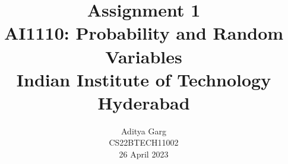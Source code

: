 \documentclass[journal,12pt,twocolumn]{IEEEtran}
\begin{document}
\newtheorem{theorem}{Theorem}[section]
\newtheorem{problem}{Problem}
\newtheorem{proposition}{Proposition}[section]
\newtheorem{lemma}{Lemma}[section]
\newtheorem{corollary}[theorem]{Corollary}
\newtheorem{example}{Example}[section]
\newtheorem{definition}[problem]{Definition}
\newcommand{\BEQA}{\begin{eqnarray}}
\newcommand{\EEQA}{\end{eqnarray}}
\newcommand{\define}{\stackrel{\triangle}{=}}



\providecommand{\mbf}{\mathbf}
\providecommand{\pr}[1]{\ensuremath{\Pr\left(#1\right)}}
\providecommand{\qfunc}[1]{\ensuremath{Q\left(#1\right)}}
\providecommand{\sbrak}[1]{\ensuremath{{}\left[#1\right]}}
\providecommand{\lsbrak}[1]{\ensuremath{{}\left[#1\right.}}
\providecommand{\rsbrak}[1]{\ensuremath{{}\left.#1\right]}}
\providecommand{\brak}[1]{\ensuremath{\left(#1\right)}}
\providecommand{\lbrak}[1]{\ensuremath{\left(#1\right.}}
\providecommand{\rbrak}[1]{\ensuremath{\left.#1\right)}}
\providecommand{\cbrak}[1]{\ensuremath{\left\{#1\right\}}}
\providecommand{\lcbrak}[1]{\ensuremath{\left\{#1\right.}}
\providecommand{\rcbrak}[1]{\ensuremath{\left.#1\right\}}}
\theoremstyle{remark}
\newtheorem{rem}{Remark}
\newcommand{\sgn}{\mathop{\mathrm{sgn}}}

\newcommand{\solution}{\noindent \textbf{Solution: }}
\newcommand{\cosec}{\,\text{cosec}\,}
\providecommand{\dec}[2]{\ensuremath{\overset{#1}{\underset{#2}{\gtrless}}}}
\newcommand{\myvec}[1]{\ensuremath{\begin{pmatrix}#1\end{pmatrix}}}
\newcommand{\mydet}[1]{\ensuremath{\begin{vmatrix}#1\end{vmatrix}}}

\let\vec\mathbf


\vspace{3cm}

\title{
   Assignment 1\\ \Large AI1110: Probability and Random Variables \\ \large Indian Institute of Technology Hyderabad
}
\author{ Aditya Garg \\ CS22BTECH11002 \\ 26 April 2023	
	
}	
\maketitle
\newpage
\bigskip
\renewcommand{\thefigure}{\theenumi}
\renewcommand{\thetable}{\theenumi}
\end{document}

